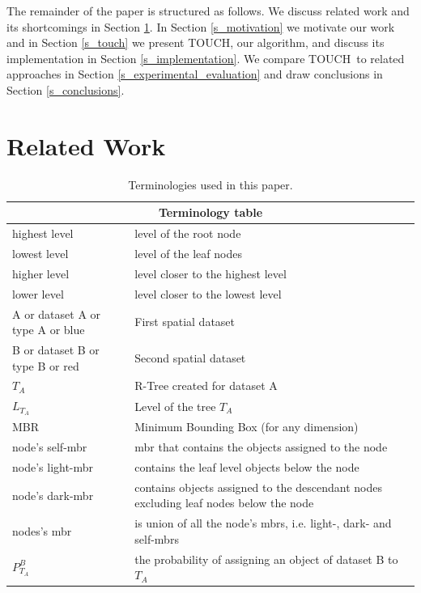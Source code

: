 \documentclass{vldb}
\newcommand{\sref}[1]{Section \ref{#1}}
\newcommand{\SJ}{TOUCH}
\begin{document}
The remainder of the paper is structured as follows. We discuss related work and its shortcomings in \sref{s_related_work}. In \sref{s_motivation} we motivate
our work and in \sref{s_touch} we present \SJ, our algorithm, and discuss its implementation in \sref{s_implementation}. We compare \SJ~to related approaches in
\sref{s_experimental_evaluation} and draw conclusions in \sref{s_conclusions}.


\vspace{-3mm}
\section{Related Work}
\label{s_related_work}

\begin{table}
\centering
\begin{tabular}{ |l|l| }
  \hline
  \multicolumn{2}{|c|}{Terminology table} \\
  \hline
  highest level & level of the root node \\
  lowest level & level of the leaf nodes \\
  higher level & level closer to the highest level \\
  lower level & level closer to the lowest level \\
  A or dataset A or type A or blue& First spatial dataset \\
  B or dataset B or type B or red& Second spatial dataset \\
  $T_A$ & R-Tree created for dataset A \\
  $L_{T_A}$ & Level of the tree $T_A$ \\
  MBR & Minimum Bounding Box (for any dimension) \\
  node's self-mbr & mbr that contains the objects assigned to the node \\
node's light-mbr & contains the leaf level objects below the node\\
node's dark-mbr & contains objects assigned to the descendant nodes excluding leaf nodes below the node\\
nodes's mbr & is union of all the node's mbrs, i.e. light-, dark- and self-mbrs\\
$P^{B}_{T_A}$ & the probability of assigning an object of dataset B to $T_A$ \\
  \hline
\end{tabular}
\caption{Terminologies used in this paper.}
\label{table:terms}
\end{table}
\end{document}
